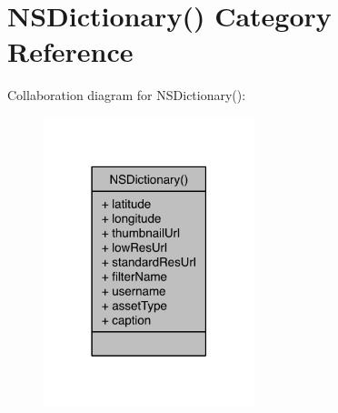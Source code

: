 \hypertarget{category_n_s_dictionary_07_08}{\section{N\-S\-Dictionary() Category Reference}
\label{category_n_s_dictionary_07_08}
}


Collaboration diagram for N\-S\-Dictionary()\-:
\nopagebreak
\begin{figure}[H]
\begin{center}
\leavevmode
\includegraphics[width=174pt]{category_n_s_dictionary_07_08__coll__graph}
\end{center}
\end{figure}
